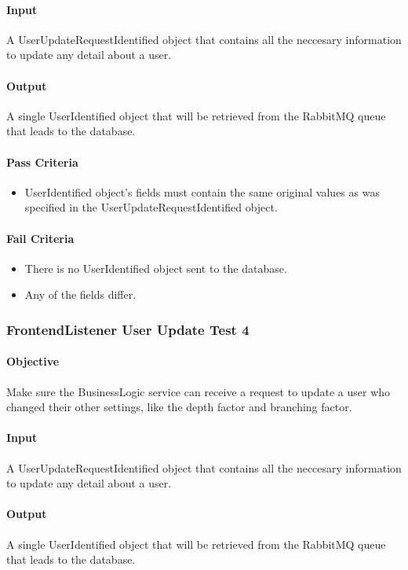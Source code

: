 \documentclass[hidelinks,english]{article}
\begin{document}
				\paragraph{Input} A UserUpdateRequestIdentified object that contains all the neccesary information to update any detail about a user.
				\paragraph{Output} A single UserIdentified object that will be retrieved from the RabbitMQ queue that leads to the database.
				\paragraph{Pass Criteria}
				\begin{itemize}
					\item UserIdentified object's fields must contain the same original values as was specified in the UserUpdateRequestIdentified object.
				\end{itemize}
				\paragraph{Fail Criteria}
				\begin{itemize}
					\item There is no UserIdentified object sent to the database.
					\item Any of the fields differ.
				\end{itemize}
				
			\subsubsection{FrontendListener User Update Test 4}\label{businessfrontendlistenerupdatetest4}
				\paragraph{Objective} Make sure the BusinessLogic service can receive a request to update a user who changed their other settings, like the depth factor and branching factor.
				\paragraph{Input} A UserUpdateRequestIdentified object that contains all the neccesary information to update any detail about a user.
				\paragraph{Output} A single UserIdentified object that will be retrieved from the RabbitMQ queue that leads to the database.
\end{document}
